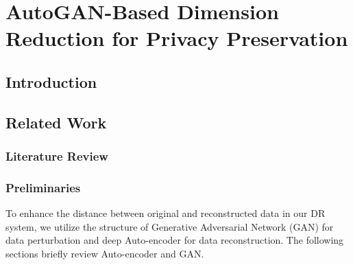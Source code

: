 

\newcommand{\argmin}[1]{\underset{#1}{\operatorname{arg}\,\operatorname{min}}\;}
\newcommand{\minmax}[1]{\underset{#1}{\operatorname{min}\,\operatorname{max}}\;}	
\newcommand{\prob}[1]{p_#1} 	

\newtheorem{example}{\bf Example}
\newtheorem{definition}{\bf Definition}
\newtheorem{theorem}{\bf Theorem}
\newtheorem{claim}{\bf Claim}
\newtheorem{proposition}{\bf Proposition}
\newtheorem{lemma}{\bf Lemma}
\newtheorem{remark}{\bf Remark}
\newtheorem{collolary}{\bf Collolary}


\newcommand{\Name}{AutoGAN-based Dimension Reduction for Privacy Preservation}
\newcommand{\shortName}{AGDRPP}

\newcommand{\ChapterPathAutoGAN}{Chapter4}

\chapter[AutoGAN-Based Dimension Reduction for Privacy Preservation]{AutoGAN-Based Dimension Reduction for Privacy Preservation \footnotemark }

\label{chap:AUTOGAN}


\section{Introduction}
\label{sec:introduction}

	
\section{Related Work}
\label{sec:autogan_relatedwork}
\subsection{Literature Review}

	
\subsection{Preliminaries}
	To enhance the distance between original and reconstructed data in our DR system, we utilize the structure of Generative Adversarial Network (GAN) \cite{Goodfellow2014} for data perturbation and deep Auto-encoder \cite{Baldi2012} for data reconstruction. The following sections briefly review Auto-encoder and GAN.

